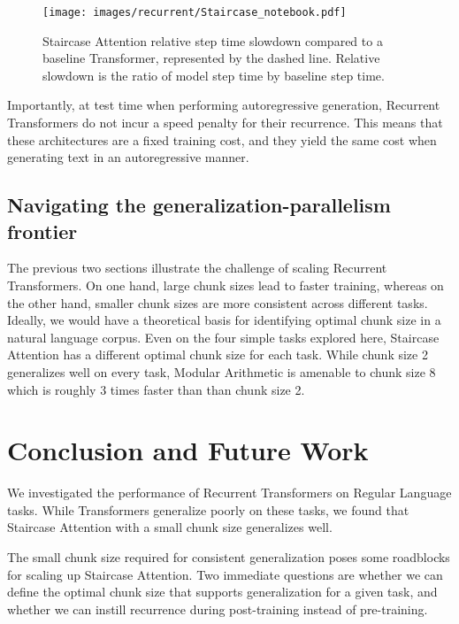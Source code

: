     
    \begin{figure}
        \centering
        \texttt{[image: images/recurrent/Staircase\_notebook.pdf]}
        \caption{Staircase Attention relative step time slowdown compared to a baseline Transformer, represented by the dashed line. Relative slowdown is the ratio of model step time by baseline step time.}
        \label{fig:speed}
    \end{figure}
    
    Importantly, at test time when performing autoregressive generation, Recurrent Transformers do not incur a speed penalty for their recurrence. This means that these architectures are a fixed training cost, and they yield the same cost when generating text in an autoregressive manner.
    
    \subsection{Navigating the generalization-parallelism frontier}
    The previous two sections illustrate the challenge of scaling Recurrent Transformers. On one hand, large chunk sizes lead to faster training, whereas on the other hand, smaller chunk sizes are more consistent across different tasks. Ideally, we would have a theoretical basis for identifying optimal chunk size in a natural language corpus. Even on the four simple tasks explored here, Staircase Attention has a different optimal chunk size for each task. While chunk size 2 generalizes well on every task, Modular Arithmetic is amenable to chunk size 8 which is roughly 3 times faster than than chunk size 2.
    
    \section{Conclusion and Future Work}
    
    We investigated the performance of Recurrent Transformers on Regular Language tasks. While Transformers generalize poorly on these tasks, we found that Staircase Attention with a small chunk size generalizes well. 
    
    The small chunk size required for consistent generalization poses some roadblocks for scaling up Staircase Attention. Two immediate questions are whether we can define the optimal chunk size that supports generalization for a given task, and whether we can instill recurrence during post-training instead of pre-training.
    
